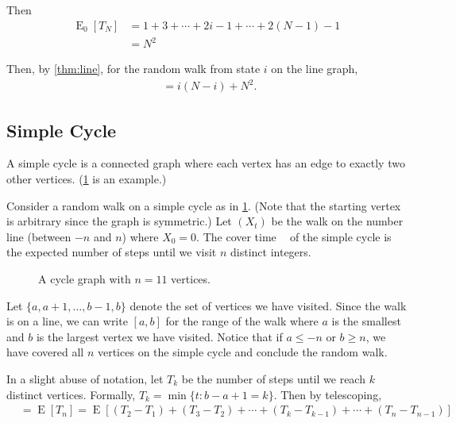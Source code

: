 \documentclass[12pt]{article}
\theoremstyle{definition}
\DeclareMathOperator{\E}{\mathrm{E}}		     %
\DeclareMathOperator{\tcov}{t_\textrm{cov}}      %
\begin{document}
Then
\begin{align}
\E_0[T_N] &= 1 + 3 + \cdots + 2i - 1 + \cdots + 2(N-1) -1 \nonumber \\
&= N^2 \nonumber
\end{align}

Then, by \cref{thm:line}, for the random walk from state $i$ on the line graph,
\begin{align}
\tcov = i(N-i) + N^2. \nonumber
\end{align}

\subsection{Simple Cycle}\label{sec:simple_cycle}

A simple cycle is a connected graph where
each vertex has an edge to exactly two other vertices.
(\cref{fig:cycle} is an example.)

Consider a random walk on a simple cycle as in \cref{fig:cycle}.
(Note that the starting vertex is arbitrary since the graph is symmetric.)
Let $(X_t)$ be the walk on the number line (between $-n$ and $n$)
where $X_0 = 0$.
The cover time $\tcov$ of the simple cycle is the expected number of steps 
until we visit $n$ distinct integers.

\begin{figure}[ht]
	\centering
	\caption{A cycle graph with $n=11$ vertices.}\label{fig:cycle}
\end{figure}

Let $\{a, a+1, \ldots, b-1, b\}$ 
denote the set of vertices we have visited.
Since the walk is on a line, we can write $[a,b]$ for the range
of the walk where $a$ is the smallest 
and $b$ is the largest vertex we have visited.
Notice that if $a \leq -n$ or $b \geq n$, we have covered all $n$ vertices
on the simple cycle and conclude the random walk.

In a slight abuse of notation, let $T_k$ be the 
number of steps until we reach $k$ distinct vertices.
Formally, $T_k = \min\{t: b-a+1 = k\}$.
Then by telescoping,
\begin{align}
\tcov &= \E[T_n] = \E[(T_2 - T_1) + (T_3 - T_2) + \cdots + 
(T_k - T_{k-1}) + \cdots + (T_n - T_{n-1})] \nonumber
\end{align}
\end{document}
